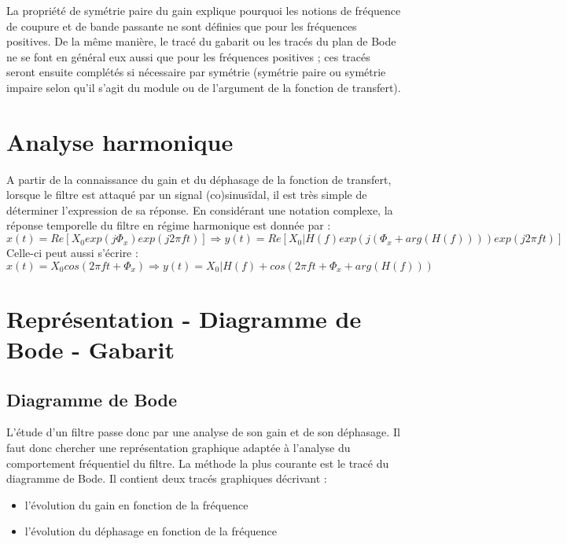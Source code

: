 \documentclass[]{report}
\begin{document}
	La propriété de symétrie paire du gain explique pourquoi les notions de fréquence de coupure et de bande passante ne sont définies que pour les fréquences positives. De la même manière, le tracé du gabarit ou les tracés du plan de Bode ne se font en général eux aussi que pour les fréquences positives ; ces tracés seront ensuite complétés si nécessaire par symétrie (symétrie paire ou symétrie impaire selon qu’il s’agit du module ou de l’argument de la fonction de transfert).
	
	\section{Analyse harmonique}
	A partir de la connaissance du gain et du déphasage de la fonction de transfert, lorsque le filtre est attaqué par un signal (co)sinusïdal, il est très simple de déterminer l'expression de sa réponse. En considérant une notation complexe, la réponse temporelle du filtre en régime harmonique est donnée par :
	\begin{equation}\label{}
	x(t) = Re[X_{0}exp(j\Phi_{x})exp(j2\pi ft)] \Rightarrow y(t) = Re[X_{0}|H(f)exp(j(\Phi_{x}+arg(H(f))))exp(j2\pi ft)]
	\end{equation}
	Celle-ci peut aussi s'écrire :
	\begin{equation}\label{key}
	x(t) = X_{0}cos(2\pi ft+\Phi_{x}) \Rightarrow y(t) = X_{0}|H(f)+cos(2\pi ft+\Phi_{x}+arg(H(f)))
	\end{equation}
	
	\section{Représentation - Diagramme de Bode - Gabarit}
	\subsection{Diagramme de Bode}
	L'étude d'un filtre passe donc par une analyse de son gain et de son déphasage. Il faut donc chercher une représentation graphique adaptée à l'analyse du comportement fréquentiel du filtre. La méthode la plus courante est le tracé du diagramme de Bode. Il contient deux tracés graphiques décrivant :
	\begin{itemize}
		\item l'évolution du gain en fonction de la fréquence
		\item l'évolution du déphasage en fonction de la fréquence
	\end{itemize}
\end{document}
